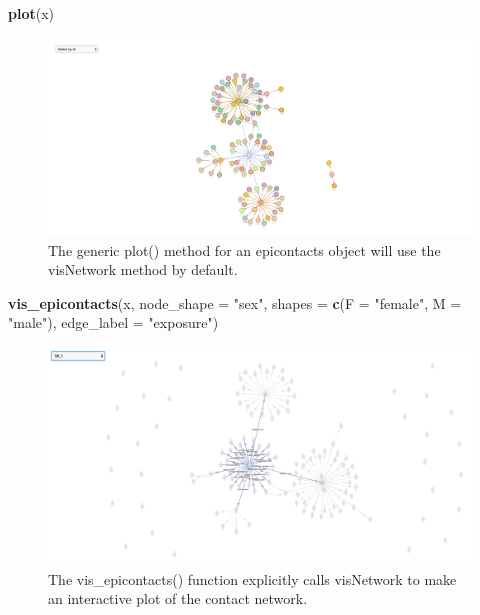 \documentclass[9pt,a4paper,]{extarticle}
\newenvironment{Shaded}{\begin{snugshade}}{\end{snugshade}}
\newcommand{\KeywordTok}[1]{\textcolor[rgb]{0.13,0.29,0.53}{\textbf{#1}}}
\newcommand{\DataTypeTok}[1]{\textcolor[rgb]{0.13,0.29,0.53}{#1}}
\newcommand{\StringTok}[1]{\textcolor[rgb]{0.31,0.60,0.02}{#1}}
\newcommand{\NormalTok}[1]{#1}
\theoremstyle{definition}
\theoremstyle{definition}
\theoremstyle{definition}
\theoremstyle{remark}
\begin{document}
\begin{Shaded}
\begin{Highlighting}[]
\KeywordTok{plot}\NormalTok{(x)}
\end{Highlighting}
\end{Shaded}

\begin{figure}
\centering
\includegraphics[width=1.00000\textwidth]{figure1.png}
\caption{The generic plot() method for an epicontacts object will use the visNetwork method by default.}
\end{figure}

\begin{Shaded}
\begin{Highlighting}[]
\KeywordTok{vis_epicontacts}\NormalTok{(x,}
                \DataTypeTok{node_shape =} \StringTok{"sex"}\NormalTok{,}
                \DataTypeTok{shapes =} \KeywordTok{c}\NormalTok{(}\DataTypeTok{F =} \StringTok{"female"}\NormalTok{, }\DataTypeTok{M =} \StringTok{"male"}\NormalTok{),}
                \DataTypeTok{edge_label =} \StringTok{"exposure"}\NormalTok{)}
\end{Highlighting}
\end{Shaded}

\begin{figure}
\centering
\includegraphics[width=1.00000\textwidth]{figure2.png}
\caption{The vis\_epicontacts() function explicitly calls visNetwork to make an interactive plot of the contact network.}
\end{figure}
\end{document}
